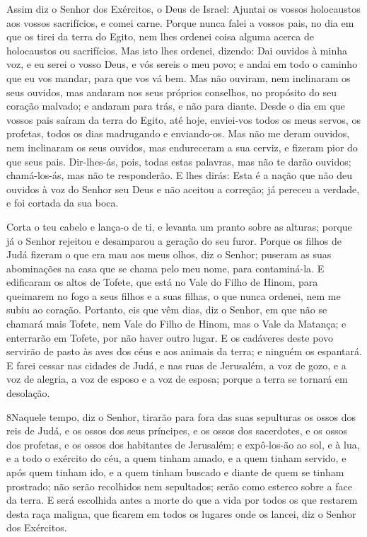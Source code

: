 Assim diz o Senhor dos Exércitos, o Deus de Israel: Ajuntai os
vossos holocaustos aos vossos sacrifícios, e comei carne.
Porque nunca falei a vossos pais, no dia em que os tirei da
terra do Egito, nem lhes ordenei coisa alguma acerca de holocaustos
ou sacrifícios. Mas isto lhes ordenei, dizendo: Dai ouvidos à
minha voz, e eu serei o vosso Deus, e vós sereis o meu povo; e andai
em todo o caminho que eu vos mandar, para que vos vá bem. Mas
não ouviram, nem inclinaram os seus ouvidos, mas andaram nos seus
próprios conselhos, no propósito do seu coração malvado; e andaram
para trás, e não para diante. Desde o dia em que vossos pais
saíram da terra do Egito, até hoje, enviei-vos todos os meus servos,
os profetas, todos os dias madrugando e enviando-os. Mas não
me deram ouvidos, nem inclinaram os seus ouvidos, mas endureceram a
sua cerviz, e fizeram pior do que seus pais. Dir-lhes-ás,
pois, todas estas palavras, mas não te darão ouvidos; chamá-los-ás,
mas não te responderão. E lhes dirás: Esta é a nação que não
deu ouvidos à voz do Senhor seu Deus e não aceitou a correção; já
pereceu a verdade, e foi cortada da sua boca.

Corta o teu cabelo e lança-o de ti, e levanta um pranto sobre as
alturas; porque já o Senhor rejeitou e desamparou a geração do seu
furor. Porque os filhos de Judá fizeram o que era mau aos
meus olhos, diz o Senhor; puseram as suas abominações na casa que se
chama pelo meu nome, para contaminá-la. E edificaram os altos
de Tofete, que está no Vale do Filho de Hinom, para queimarem no
fogo a seus filhos e a suas filhas, o que nunca ordenei, nem me
subiu ao coração. Portanto, eis que vêm dias, diz o Senhor,
em que não se chamará mais Tofete, nem Vale do Filho de Hinom, mas o
Vale da Matança; e enterrarão em Tofete, por não haver outro lugar.
E os cadáveres deste povo servirão de pasto às aves dos céus
e aos animais da terra; e ninguém os espantará. E farei
cessar nas cidades de Judá, e nas ruas de Jerusalém, a voz de gozo,
e a voz de alegria, a voz de esposo e a voz de esposa; porque a
terra se tornará em desolação.

\medskip

\lettrine{8} Naquele tempo, diz o Senhor, tirarão para fora
das suas sepulturas os ossos dos reis de Judá, e os ossos dos seus
príncipes, e os ossos dos sacerdotes, e os ossos dos profetas, e os
ossos dos habitantes de Jerusalém; e expô-los-ão ao sol, e à
lua, e a todo o exército do céu, a quem tinham amado, e a quem
tinham servido, e após quem tinham ido, e a quem tinham buscado e
diante de quem se tinham prostrado; não serão recolhidos nem
sepultados; serão como esterco sobre a face da terra. E será
escolhida antes a morte do que a vida por todos os que restarem
desta raça maligna, que ficarem em todos os lugares onde os lancei,
diz o Senhor dos Exércitos.


